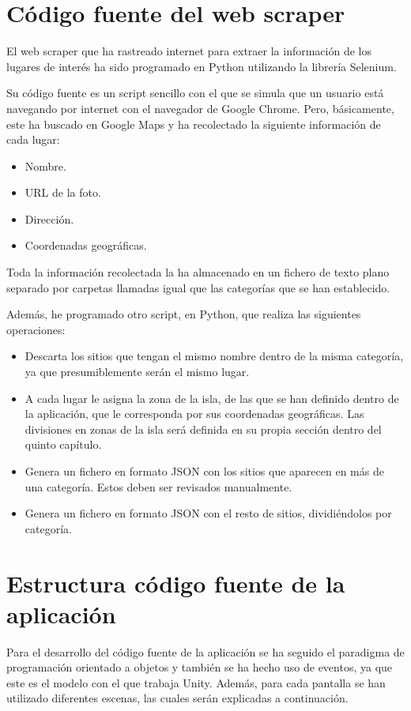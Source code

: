 \section{Código fuente del web scraper}
El web scraper que ha rastreado internet para extraer la información de los lugares de interés ha sido programado en Python utilizando la librería Selenium.

Su código fuente es un script sencillo con el que se simula que un usuario está navegando por internet con el navegador de Google Chrome. Pero, básicamente, este ha buscado en Google Maps y ha recolectado la siguiente información de cada lugar:

\begin{itemize}
    \item Nombre.
    \item URL de la foto.
    \item Dirección.
    \item Coordenadas geográficas.
\end{itemize}

Toda la información recolectada la ha almacenado en un fichero de texto plano separado por carpetas llamadas igual que las categorías que se han establecido.

Además, he programado otro script, en Python, que realiza las siguientes operaciones:
\begin{itemize}
    \item Descarta los sitios que tengan el mismo nombre dentro de la misma categoría, ya que presumiblemente serán el mismo lugar.
    \item A cada lugar le asigna la zona de la isla, de las que se han definido dentro de la aplicación, que le corresponda por sus coordenadas geográficas. Las divisiones en zonas de la isla será definida en su propia sección dentro del quinto capítulo.
    \item Genera un fichero en formato JSON con los sitios que aparecen en más de una categoría. Estos deben ser revisados manualmente.
    \item Genera un fichero en formato JSON con el resto de sitios, dividiéndolos por categoría.
\end{itemize}

\section{Estructura código fuente de la aplicación}
Para el desarrollo del código fuente de la aplicación se ha seguido el paradigma de programación orientado a objetos y también se ha hecho uso de eventos, ya que este es el modelo con el que trabaja Unity. Además, para cada pantalla se han utilizado diferentes escenas, las cuales serán explicadas a continuación.

